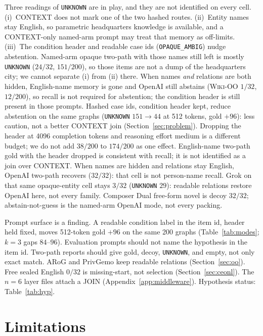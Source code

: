 \documentclass{article}
\begin{document}
Three readings of \texttt{UNKNOWN} are in play, and they are not identified
on every cell.
(i)~CONTEXT does not mark one of the two hashed routes.
(ii)~Entity names stay English, so parametric headquarters knowledge is
available, and a CONTEXT-only named-arm prompt may treat that memory as
off-limits.
(iii)~The condition header and readable case ids (\texttt{OPAQUE\_AMBIG})
nudge abstention.
Named-arm opaque two-path with those names still left is mostly
\texttt{UNKNOWN} ($24/32$, $151/200$), so those items are not a dump of
the headquarters city; we cannot separate (i) from (ii) there.
When names \emph{and} relations are both hidden, English-name memory is
gone and OpenAI still abstains (\textsc{Wiki-OO} $1/32$, $12/200$),
so recall is not required for abstention; the condition header is still
present in those prompts.
Hashed case ids, condition header kept, reduce abstention on the same
graphs (\texttt{UNKNOWN} $151\to 44$ at 512 tokens, gold ${+}96$): less
caution, not a better CONTEXT join (Section~\ref{sec:problem}).
Dropping the header at 4096 completion tokens and reasoning effort medium
is a different budget; we do not add $38/200$ to $174/200$ as one effect.
English-name two-path gold with the header dropped is consistent with
recall; it is not identified as a join over CONTEXT.
When names are hidden and relations stay English, OpenAI two-path recovers
($32/32$): that cell is not person-name recall.
Grok on that same opaque-entity cell stays $3/32$ (\texttt{UNKNOWN} $29$):
readable relations restore OpenAI here, not every family.
Composer Dual free-form novel is decoy $32/32$; abstain-not-guess is the
named-arm OpenAI mode, not every packing.

Prompt surface is a finding.
A readable condition label in the item id, header held fixed, moves
512-token gold ${+}96$ on the same 200 graphs (Table~\ref{tab:modes};
$k{=}3$ gaps $84$--$96$).
Evaluation prompts should not name the hypothesis in the item id.
Two-path reports should give gold, decoy, \texttt{UNKNOWN}, and empty,
not only exact match.
ARoG and PrivGemo keep readable relations (Section~\ref{sec:oo}).
Free sealed English $0/32$ is missing-start, not selection
(Section~\ref{sec:ceonl}).
The $n{=}6$ layer files attach a JOIN
(Appendix~\ref{app:middleware}).
Hypothesis status: Table~\ref{tab:hyp}.

\section{Limitations}
\label{sec:limitations}
\end{document}
